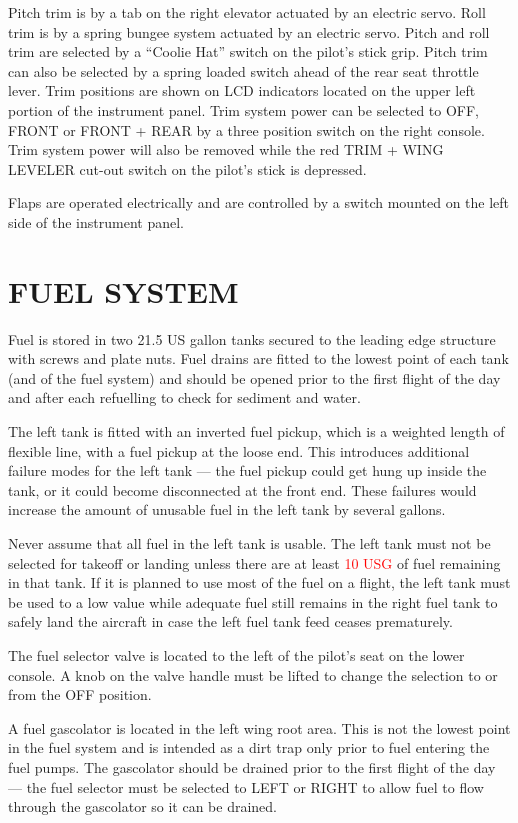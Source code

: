 Pitch trim is by a tab on the right elevator actuated by an electric servo. Roll trim is by a spring bungee system actuated by an electric servo. Pitch and roll trim are selected by a ``Coolie Hat'' switch on the pilot's stick grip. Pitch trim can also be selected by a spring loaded switch ahead of the rear seat throttle lever. Trim positions are shown on LCD indicators located on the upper left portion of the instrument panel. Trim system power can be selected to OFF, FRONT or FRONT + REAR by a three position switch on the right console. Trim system power will also be removed while the red TRIM + WING LEVELER cut-out switch on the pilot's stick is depressed.

Flaps are operated electrically and are controlled by a switch mounted on the left side of the instrument panel.

\section{FUEL SYSTEM} Fuel is stored in two 21.5 US gallon tanks secured to the leading edge structure with screws and plate nuts. Fuel drains are fitted to the lowest point of each tank (and of the fuel system) and should be opened prior to the first flight of the day and after each refuelling to check for sediment and water.

The left tank is fitted with an inverted fuel pickup, which is a weighted length of flexible line, with a fuel pickup at the loose end. This introduces additional failure modes for the left tank --- the fuel pickup could get hung up inside the tank, or it could become disconnected at the front end. These failures would increase the amount of unusable fuel in the left tank by several gallons.
\begin{Note}
[WARNING] Never assume that all fuel in the left tank is usable. The left tank must not be selected for takeoff or landing unless there are at least \textcolor{red}{10 USG} of fuel remaining in that tank. If it is planned to use most of the fuel on a flight, the left tank must be used to a low value while adequate fuel still remains in the right fuel tank to safely land the aircraft in case the left fuel tank feed ceases prematurely. 
\end{Note}

The fuel selector valve is located to the left of the pilot's seat on the lower console. A knob on the valve handle must be lifted to change the selection to or from the OFF position.

A fuel gascolator is located in the left wing root area. This is not the lowest point in the fuel system and is intended as a dirt trap only prior to fuel entering the fuel pumps. The gascolator should be drained prior to the first flight of the day --- the fuel selector must be selected to LEFT or RIGHT to allow fuel to flow through the gascolator so it can be drained.

